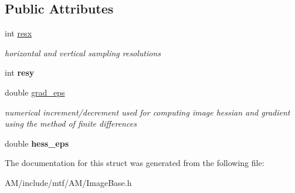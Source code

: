 \subsection*{Public Attributes}
\begin{DoxyCompactItemize}
\item 
\hypertarget{structImgParams_aa12bf4a79cb15c878b37e424b52683c3}{int \hyperlink{structImgParams_aa12bf4a79cb15c878b37e424b52683c3}{resx}}\label{structImgParams_aa12bf4a79cb15c878b37e424b52683c3}

\begin{DoxyCompactList}\small\item\em horizontal and vertical sampling resolutions \end{DoxyCompactList}\item 
\hypertarget{structImgParams_a14ba5c6220070dfef8f12a0ec4fe14f5}{int {\bfseries resy}}\label{structImgParams_a14ba5c6220070dfef8f12a0ec4fe14f5}

\item 
\hypertarget{structImgParams_a2b802e547e383df054bd8060023a6e66}{double \hyperlink{structImgParams_a2b802e547e383df054bd8060023a6e66}{grad\-\_\-eps}}\label{structImgParams_a2b802e547e383df054bd8060023a6e66}

\begin{DoxyCompactList}\small\item\em numerical increment/decrement used for computing image hessian and gradient using the method of finite differences \end{DoxyCompactList}\item 
\hypertarget{structImgParams_af0c157dec6f1c2f4143ff1067b50274d}{double {\bfseries hess\-\_\-eps}}\label{structImgParams_af0c157dec6f1c2f4143ff1067b50274d}

\end{DoxyCompactItemize}


The documentation for this struct was generated from the following file\-:\begin{DoxyCompactItemize}
\item 
A\-M/include/mtf/\-A\-M/Image\-Base.\-h\end{DoxyCompactItemize}
